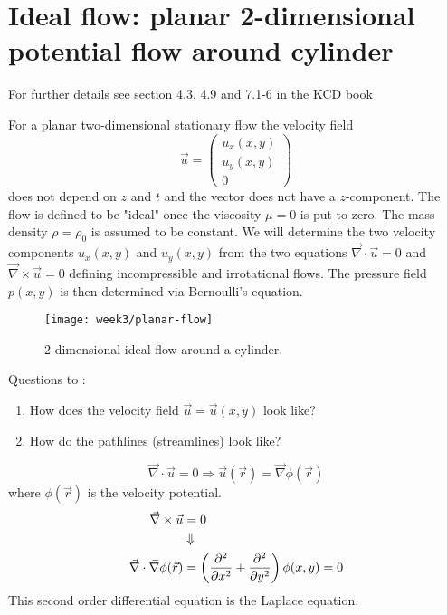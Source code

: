 \section{Ideal flow: planar 2-dimensional potential flow around cylinder}

\begin{framed}
For further details see section 4.3, 4.9 and 7.1-6 in the KCD book
\end{framed}

For a planar two-dimensional stationary flow the velocity field
\begin{equation}
\vec{u}=
\begin{pmatrix}
u_x(x,y)\\u_y(x,y)\\0
\end{pmatrix}
\end{equation}
does not depend on $z$ and $t$ and the vector does not have a $z$-component. The flow is defined to be "ideal" once the viscosity $\mu=0$ is put to zero. The mass density $\rho=\rho_0$ is assumed to be constant. We will determine the two velocity components $u_x(x,y)$ and $u_y(x,y)$ from the two equations $\vec{\nabla}\cdot\vec{u}=0$ and $\vec{\nabla}\times\vec{u}=0$ defining incompressible and irrotational flows. The pressure field $p(x,y)$ is then determined via Bernoulli's equation.

\begin{figure}[!h]
    \centering
    \texttt{[image: week3/planar-flow]}
    \caption{2-dimensional ideal flow around a cylinder.}
    \label{fig:planar-flow}
\end{figure}

Questions to :
\begin{enumerate}
\item How does the velocity field $\vec{u} = \vec{u}(x,y)$ look like?
\item How do the pathlines (streamlines) look like?
\end{enumerate}
\begin{equation}
\vec{\nabla}\cdot\vec{u} = 0 \Rightarrow \vec{u}(\vec{r}) = \vec{\nabla}\phi(\vec{r})
\end{equation}
where $\phi(\vec{r})$ is the velocity potential.
\begin{align}
\vec{\nabla}\times\vec{u} &= 0\\
&\Downarrow\notag\\
\vec{\nabla}\cdot\vec{\nabla}\phi(\vec{r}) &= \left(\frac{\partial^2 }{\partial x^2}+\frac{\partial^2 }{\partial y^2}\right)\phi(x,y) = 0
\end{align}
This second order differential equation is the Laplace equation.

